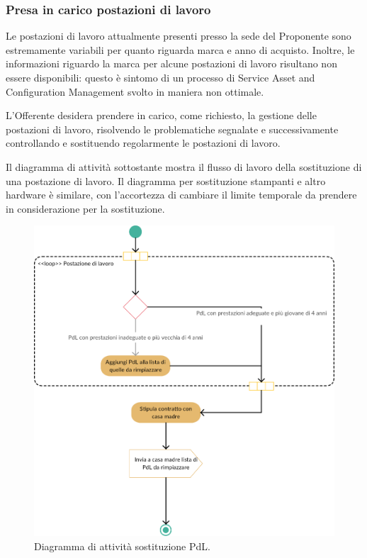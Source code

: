                     \subsubsection{Presa in carico postazioni di lavoro}
                    	Le postazioni di lavoro attualmente presenti presso la sede del Proponente sono estremamente variabili per quanto riguarda marca e anno di acquisto. Inoltre, le informazioni riguardo la marca per alcune postazioni di lavoro risultano non essere disponibili: questo è sintomo di un processo di Service Asset and Configuration Management svolto in maniera non ottimale.
                        
                        
                        L'Offerente desidera prendere in carico, come richiesto, la gestione delle postazioni di lavoro, risolvendo le problematiche segnalate e successivamente controllando e sostituendo regolarmente le postazioni di lavoro.
                        
                        
                        Il diagramma di attività sottostante mostra il flusso di lavoro della sostituzione di una postazione di lavoro. Il diagramma per sostituzione stampanti e altro hardware è similare, con l'accortezza di cambiare il limite temporale da prendere in considerazione per la sostituzione.
                        \begin{figure}[H]
							\centering
							\includegraphics[scale=0.237]{immagini/rollout/sostituzione-pdl}
							\caption{Diagramma di attività sostituzione PdL.}
							\end{figure}
                        
